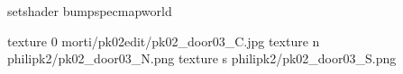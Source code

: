 setshader bumpspecmapworld

texture 0 morti/pk02edit/pk02_door03_C.jpg
texture n philipk2/pk02_door03_N.png
texture s philipk2/pk02_door03_S.png


